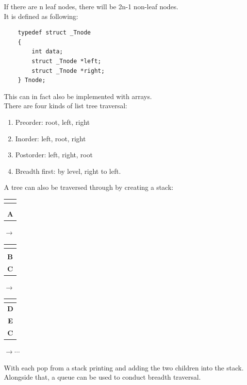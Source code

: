 \documentclass[nobib]{tufte-handout}
\begin{document}
If there are n leaf nodes, there will be 2n-1 non-leaf nodes.\\
It is defined as following:\\
\begin{lstlisting}
    typedef struct _Tnode
    {
        int data;
        struct _Tnode *left;
        struct _Tnode *right;
    } Tnode;
\end{lstlisting}
This can in fact also be implemented with arrays.\\
There are four kinds of list tree traversal:
\begin{enumerate}
    \item Preorder: root, left, right
    \item Inorder: left, root, right
    \item Postorder: left, right, root
    \item Breadth first: by level, right to left.
\end{enumerate}
A tree can also be traversed through by creating a stack:\\
\begin{table}
    \centering
    \begin{tabular}[b]{|c|}
        \hline
        \textbf{} \\
        \hline
        \textbf{} \\
        \hline
        \textbf{} \\
        \hline
        \textbf{A} \\
        \hline
    \end{tabular}
    $\rightarrow$
    \begin{tabular}[b]{|c|}
        \hline
        \textbf{} \\
        \hline
        \textbf{} \\
        \hline
        \textbf{B} \\
        \hline
        \textbf{C} \\
        \hline
    \end{tabular}
    $\rightarrow$
    \begin{tabular}[b]{|c|}
        \hline
        \textbf{} \\
        \hline
        \textbf{D} \\
        \hline
        \textbf{E} \\
        \hline
        \textbf{C} \\
        \hline
    \end{tabular}
    $\rightarrow \cdots$
\end{table}
With each pop from a stack printing and adding the two children into the stack.\\
Alongside that, a queue can be used to conduct breadth traversal.\\
\end{document}
